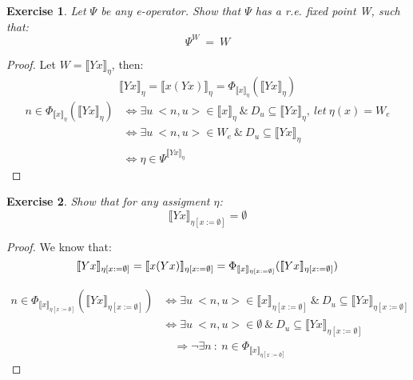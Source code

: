 \documentclass{article}
\newtheorem{exercise}{Exercise}[section]
\begin{document}
	\begin{exercise}
		Let $\Psi$ be any e-operator. Show that $\Psi$ has a 
		r.e. fixed point W, such that:
			\begin{equation}
				\Psi^W\:=\:W
			\end{equation}
	\end{exercise}
	\begin{proof}
		Let $W=\llbracket Yx \rrbracket_{\eta}$, then:
		\begin{equation}
			\llbracket Yx \rrbracket_{\eta} =
				\llbracket x(Yx) \rrbracket_{\eta} =
				\Phi_
					{\llbracket x \rrbracket_{\eta}} 
					(\llbracket Yx \rrbracket_{\eta})
		\end{equation}
		\begin{equation*}
		\begin{split}
			n \in \Phi_
					{\llbracket x \rrbracket_{\eta}} 
					(\llbracket Yx \rrbracket_{\eta})
				&\iff \exists u \: <n, u> \in 
				\llbracket x \rrbracket_{\eta} 
					\:\&\: D_u \subseteq \llbracket Yx \rrbracket_{\eta}
					,\:let\:\eta(x) = W_e\\
				&\iff \exists u \: <n, u> \in W_e
					\:\&\: D_u \subseteq \llbracket Yx \rrbracket_{\eta}\\
				&\iff \eta \in \Psi^{\llbracket Yx \rrbracket_{\eta}}
		\end{split}
		\end{equation*}
	\end{proof}

	\begin{exercise}
		Show that for any assigment $\eta$:
			\begin{equation}
				\llbracket Yx \rrbracket_{\eta[x := \emptyset]} 
					= \emptyset
			\end{equation}
	\end{exercise}
	\begin{proof}
		We know that: 
		\begin{equation}
			\llbracket Yx \rrbracket_{\eta [x := \emptyset]} =
				\llbracket x(Yx) \rrbracket_{\eta [x := \emptyset]}\\
			= \Phi_
					{\llbracket x \rrbracket_{\eta[x := \emptyset]}} 
					(\llbracket Yx \rrbracket_{\eta[x := \emptyset]})
		\end{equation}

		\begin{equation*}
		\begin{split}
			n \in \Phi_
					{\llbracket x \rrbracket_{\eta[x := \emptyset]}} 
					(\llbracket Yx \rrbracket_{\eta[x := \emptyset]})
				&\iff \exists u \: <n, u> \in 
				\llbracket x \rrbracket_{\eta[x := \emptyset]} 
					\:\&\: D_u \subseteq 
						\llbracket Yx \rrbracket_{\eta[x := \emptyset]}\\
				&\iff \exists u \: <n, u> \in \emptyset 
					\:\&\: D_u \subseteq 
						\llbracket Yx \rrbracket_{\eta[x := \emptyset]}\\
				&\quad\Rightarrow \neg \exists n\: :\: 
					n \in \Phi_{\llbracket x \rrbracket_{
						\eta[x := \emptyset]}}
		\end{split}
		\end{equation*}
	\end{proof}

	\newpage
	
	
\end{document}
